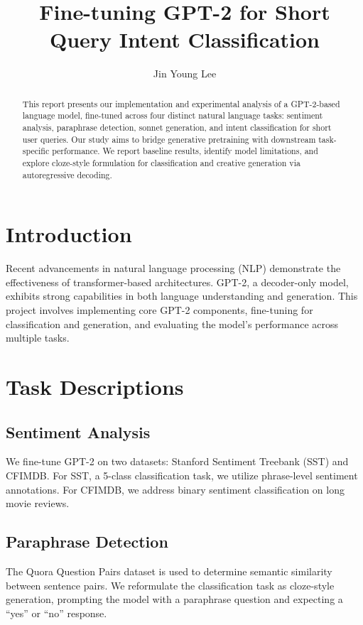 \documentclass{article}
\title{Fine-tuning GPT-2 for Short Query Intent Classification}
\author{Jin Young Lee}
\begin{document}
\maketitle

\begin{abstract}
This report presents our implementation and experimental analysis of a GPT-2-based language model, fine-tuned across four distinct natural language tasks: sentiment analysis, paraphrase detection, sonnet generation, and intent classification for short user queries. Our study aims to bridge generative pretraining with downstream task-specific performance. We report baseline results, identify model limitations, and explore cloze-style formulation for classification and creative generation via autoregressive decoding.
\end{abstract}

\section{Introduction}
Recent advancements in natural language processing (NLP) demonstrate the effectiveness of transformer-based architectures. GPT-2, a decoder-only model, exhibits strong capabilities in both language understanding and generation. This project involves implementing core GPT-2 components, fine-tuning for classification and generation, and evaluating the model's performance across multiple tasks.

\section{Task Descriptions}
\subsection{Sentiment Analysis}
We fine-tune GPT-2 on two datasets: Stanford Sentiment Treebank (SST) and CFIMDB. For SST, a 5-class classification task, we utilize phrase-level sentiment annotations. For CFIMDB, we address binary sentiment classification on long movie reviews.

\subsection{Paraphrase Detection}
The Quora Question Pairs dataset is used to determine semantic similarity between sentence pairs. We reformulate the classification task as cloze-style generation, prompting the model with a paraphrase question and expecting a ``yes'' or ``no'' response.
\end{document}
